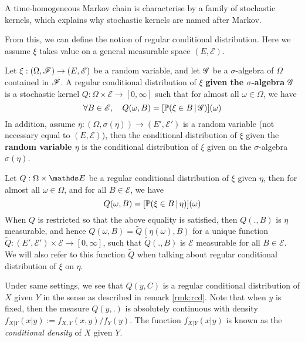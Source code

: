 \begin{unexaminable}
\begin{remark}
A time-homogeneous Markov chain is characterise by a family of stochastic kernels, which explains why stochastic kernels are named after Markov.
\end{remark}

From this, we can define the notion of regular conditional distribution. Here we assume $\xi$ takes value on a general measurable space $(E,\mathcal{E})$.

\begin{definition}
Let $\xi:(\Omega,\mathcal{F}) \to (E,\mathcal{E})$ be a random variable, and let $\mathcal{G}$ be a $\sigma$-algebra of $\Omega$ contained in $\mathcal{F}$. A regular conditional distribution of $\xi$ \textbf{given the $\sigma$-algebra} $\mathcal{G}$ is a stochastic kernel $Q: \Omega \times \mathcal{E} \to [0,\infty]$ such that for almost all $\omega \in \Omega$, we have 
\begin{equation} \label{eq:rcd}
    \forall B \in \mathcal{E}, \quad Q(\omega, B) = [\mathbb{P}(\xi \in B \,|\, \mathcal{G})](\omega)
\end{equation}
In addition, assume $\eta: (\Omega, \sigma(\eta)) \to (E',\mathcal{E}')$ is a random variable (not necessary equal to $(E,\mathcal{E})$), then the conditional distribution of $\xi$ given the \textbf{random variable $\eta$} is the conditional distribution of $\xi$ given on the $\sigma$-algebra $\sigma(\eta)$.
\end{definition}

\begin{remark} \label{rmk:rcd}
Let $Q:\Omega \times \E$ be a regular conditional distribution of $\xi$ given $\eta$, then for almost all $\omega \in \Omega$, and for all $B \in \mathcal{E}$, we have
\begin{equation}
    Q(\omega,B) = [\mathbb{P}(\xi \in B \,|\, \eta)](\omega)
\end{equation}
When $Q$ is restricted so that the above equality is satisfied, then $Q(.,B)$ is $\eta$ measurable, and hence $Q(\omega,B) = \tilde{Q}(\eta(\omega), B)$ for a unique function $\tilde{Q}: (E',\mathcal{E}') \times \mathcal{E} \to [0,\infty]$, such that $\tilde{Q}(.,B)$ is $\mathcal{E}$ measurable for all $B \in \mathcal{E}$. We will also refer to this function $\tilde{Q}$ when talking about regular conditional distribution of $\xi$ on $\eta$.
\end{remark}

\begin{example} Under same settings, we see that $Q(y,C)$ is a regular conditional distribution of $X$ given $Y$ in the sense as described in remark \ref{rmk:rcd}. Note that when $y$ is fixed, then the measure $Q(y,.)$ is absolutely continuous with density $f_{X|Y}(x|y) := f_{X,Y}(x,y)/f_Y(y)$. The function $f_{X|Y}(x|y)$ is known as the \textit{conditional density} of $X$ given $Y$.
\end{example}


\end{unexaminable}
